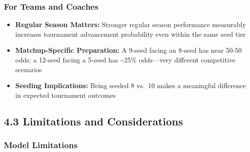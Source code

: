 \documentclass[
]{article}
\providecommand{\tightlist}{%
  \setlength{\itemsep}{0pt}\setlength{\parskip}{0pt}}
\begin{document}
\subsubsection{For Teams and Coaches}\label{for-teams-and-coaches}

\begin{itemize}
\tightlist
\item
  \textbf{Regular Season Matters:} Stronger regular season performance
  measurably increases tournament advancement probability even within
  the same seed tier
\item
  \textbf{Matchup-Specific Preparation:} A 9-seed facing an 8-seed has
  near 50-50 odds; a 12-seed facing a 5-seed has \textasciitilde25\%
  odds---very different competitive scenarios
\item
  \textbf{Seeding Implications:} Being seeded 8 vs.~10 makes a
  meaningful difference in expected tournament outcomes
\end{itemize}

\subsection{4.3 Limitations and
Considerations}\label{limitations-and-considerations}

\subsubsection{Model Limitations}\label{model-limitations}
\end{document}
